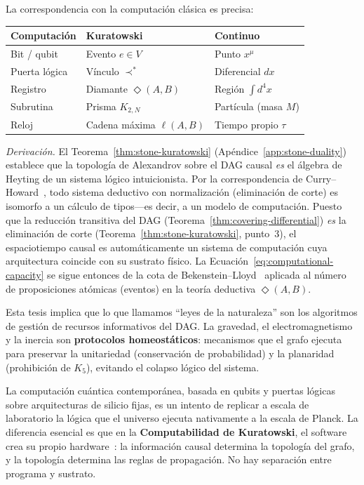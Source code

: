 \documentclass[11pt, a4paper, openany]{book}
\newcommand{\covers}{\prec^{\!*}}
\newcommand{\diam}[2]{\Diamond(#1,#2)}
\begin{document}
\noindent
La correspondencia con la computaci\'on cl\'asica es precisa:

\medskip
\begin{center}
\begin{tabular}{lll}
\toprule
\textbf{Computaci\'on} & \textbf{Kuratowski} & \textbf{Continuo}\\
\midrule
Bit / qubit     & Evento $e \in V$
                & Punto $x^\mu$\\
Puerta l\'ogica & V\'inculo $\covers$
                & Diferencial $dx$\\
Registro        & Diamante $\diam{A}{B}$
                & Regi\'on $\int d^4x$\\
Subrutina       & Prisma $K_{2,N}$
                & Part\'icula (masa $M$)\\
Reloj           & Cadena m\'axima $\ell(A,B)$
                & Tiempo propio $\tau$\\
\bottomrule
\end{tabular}
\end{center}

\medskip\noindent
\textit{Derivaci\'on.}
El Teorema~\ref{thm:stone-kuratowski} (Ap\'endice~\ref{app:stone-duality})
establece que la topolog\'ia de Alexandrov sobre el DAG causal \emph{es}
el \'algebra de Heyting de un sistema l\'ogico intuicionista. Por la
correspondencia de Curry--Howard~\cite{curryhoward}, todo sistema
deductivo con normalizaci\'on (eliminaci\'on de corte) es
isomorfo a un c\'alculo de tipos---es decir, a un modelo de
computaci\'on. Puesto que la reducci\'on transitiva del DAG
(Teorema~\ref{thm:covering-differential}) \emph{es} la eliminaci\'on de
corte (Teorema~\ref{thm:stone-kuratowski}, punto~3), el espaciotiempo
causal es autom\'aticamente un sistema de computaci\'on cuya
arquitectura coincide con su sustrato f\'isico. La
Ecuaci\'on~\eqref{eq:computational-capacity} se sigue entonces de la
cota de Bekenstein--Lloyd~\cite{bekenstein1981,lloyd2002} aplicada al
n\'umero de proposiciones at\'omicas (eventos) en la teor\'ia deductiva
$\diam{A}{B}$.

\medskip\noindent
Esta tesis implica que lo que llamamos ``leyes de la naturaleza'' son
los algoritmos de gesti\'on de recursos informativos del DAG. La
gravedad, el electromagnetismo y la inercia son \textbf{protocolos
homeost\'aticos}: mecanismos que el grafo ejecuta para preservar la
unitariedad (conservaci\'on de probabilidad) y la planaridad
(prohibici\'on de $K_5$), evitando el colapso l\'ogico del sistema.

La computaci\'on cu\'antica contempor\'anea, basada en qubits y
puertas l\'ogicas sobre arquitecturas de silicio fijas, es un intento
de replicar a escala de laboratorio la l\'ogica que el universo
ejecuta nativamente a la escala de Planck. La diferencia esencial es
que en la \textbf{Computabilidad de Kuratowski}, el software crea su
propio hardware~\cite{landauer1961}: la informaci\'on causal determina
la topolog\'ia del grafo, y la topolog\'ia determina las reglas de
propagaci\'on. No hay separaci\'on entre programa y sustrato.
\end{document}
